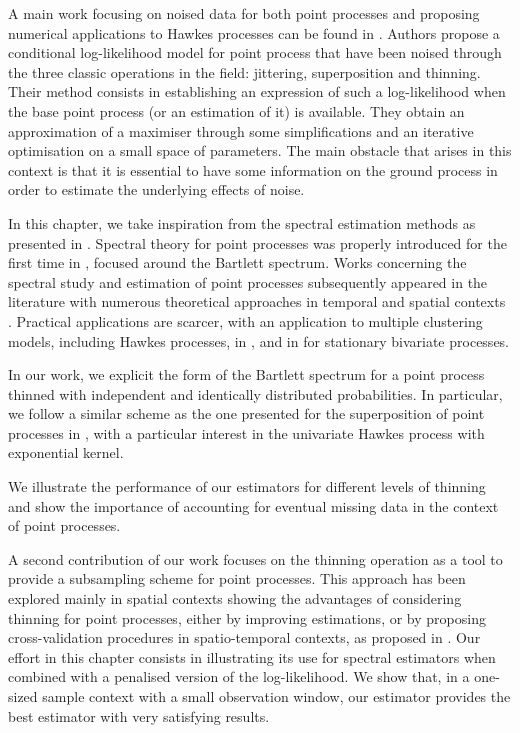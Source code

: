 A main work focusing on noised data for both point processes and proposing numerical applications to Hawkes processes can be found in \textcite{Lund2000}. 
Authors propose a conditional log-likelihood model for point process that have been noised through the three classic operations in the field: jittering, superposition and thinning. 
Their method consists in establishing an expression of such a log-likelihood when the base point process (or an estimation of it) is available.
They obtain an approximation of a maximiser through some simplifications and an iterative optimisation on a small space of parameters.
The main obstacle that arises in this context is that it is essential to have some information on the ground process in order to estimate the underlying effects of noise.

In this chapter, we take inspiration from the spectral estimation methods as presented in \textcite{Cheysson2022, Bonnet2024}.
Spectral theory for point processes was properly introduced for the first time in \textcite{Bartlett1963},
focused around the Bartlett spectrum. 
Works concerning the spectral study and estimation of point processes subsequently appeared in the literature with numerous theoretical approaches in temporal and spatial contexts \parencite{Daley1971, Tuan1981, Mugglestone2001, Rajala2023}. Practical applications are scarcer, with an application to multiple clustering models, including Hawkes processes, in \textcite{Adamopoulos1976}, and in \textcite{Karavasilis2007} for stationary bivariate processes.

In our work, we explicit the form of the Bartlett spectrum for a point process thinned with independent and identically distributed probabilities. In particular, we follow a similar scheme as the one presented for the superposition of point processes in \textcite{Bonnet2024}, with a particular interest in the univariate Hawkes process with exponential kernel.

We illustrate the performance of our estimators for different levels of thinning and show the importance of accounting for eventual missing data in the context of point processes.

A second contribution of our work focuses on the thinning operation as a tool to provide a subsampling scheme for point processes.
This approach has been explored mainly in spatial contexts \textcite{Moller2003, Moradi2019, Cronie2023} showing the advantages of considering thinning for point processes, either by improving estimations, or by proposing cross-validation procedures in spatio-temporal contexts, as proposed in \textcite{Coeurjolly2024}.
Our effort in this chapter consists in illustrating its use for spectral estimators when combined with a penalised version of the log-likelihood.
We show that, in a one-sized sample context with a small observation window, 
our estimator provides the best estimator with very satisfying results.

